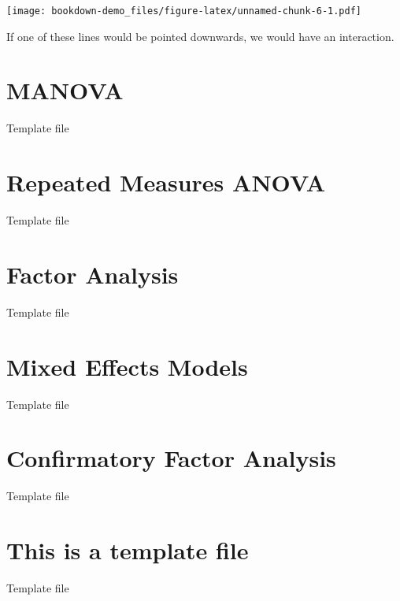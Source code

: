 \documentclass[]{book}
\theoremstyle{definition}
\theoremstyle{definition}
\theoremstyle{definition}
\theoremstyle{remark}
\begin{document}
\texttt{[image: bookdown-demo\_files/figure-latex/unnamed-chunk-6-1.pdf]}

If one of these lines would be pointed downwards, we would have an
interaction.

\chapter{MANOVA}\label{manova}

Template file

\chapter{Repeated Measures ANOVA}\label{repeated-measures-anova-1}

Template file

\chapter{Factor Analysis}\label{factor-analysis}

Template file

\chapter{Mixed Effects Models}\label{mixed-effects-models}

Template file

\chapter{Confirmatory Factor
Analysis}\label{confirmatory-factor-analysis}

Template file

\chapter{This is a template file}\label{this-is-a-template-file}

Template file


\end{document}
